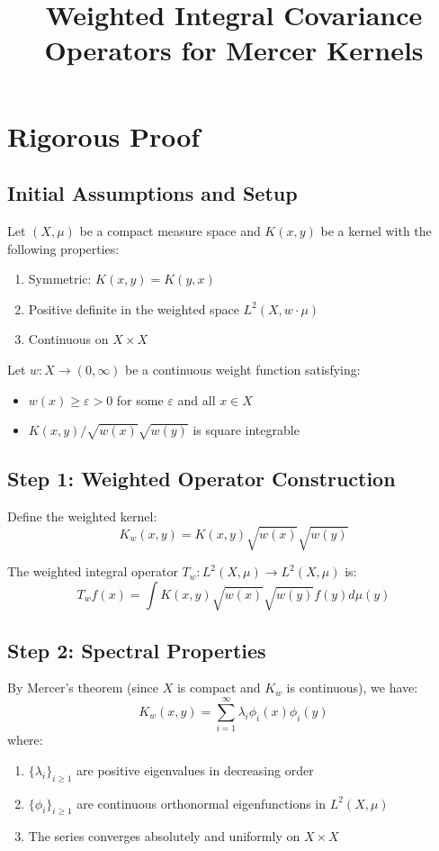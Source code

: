 \documentclass{article}
\title{Weighted Integral Covariance Operators for Mercer Kernels}
\author{}
\date{}
\begin{document}
\maketitle

\section{Rigorous Proof}

\subsection{Initial Assumptions and Setup}

Let $(X, \mu)$ be a compact measure space and $K(x,y)$ be a kernel with the following properties:
\begin{enumerate}
    \item Symmetric: $K(x,y) = K(y,x)$
    \item Positive definite in the weighted space $L^2(X,w\cdot\mu)$
    \item Continuous on $X \times X$
\end{enumerate}

Let $w: X \to (0,\infty)$ be a continuous weight function satisfying:
\begin{itemize}
    \item $w(x) \geq \varepsilon > 0$ for some $\varepsilon$ and all $x \in X$
    \item $K(x,y)/\sqrt{w(x)}\sqrt{w(y)}$ is square integrable
\end{itemize}

\subsection{Step 1: Weighted Operator Construction}

Define the weighted kernel:
\[
K_w(x,y) = K(x,y)\sqrt{w(x)}\sqrt{w(y)}
\]

The weighted integral operator $T_w: L^2(X,\mu) \to L^2(X,\mu)$ is:
\[
T_w f(x) = \int K(x,y)\sqrt{w(x)}\sqrt{w(y)}f(y)d\mu(y)
\]

\subsection{Step 2: Spectral Properties}

By Mercer's theorem (since $X$ is compact and $K_w$ is continuous), we have:
\[
K_w(x,y) = \sum_{i=1}^{\infty} \lambda_i \phi_i(x)\phi_i(y)
\]
where:
\begin{enumerate}
    \item $\{\lambda_i\}_{i\geq1}$ are positive eigenvalues in decreasing order
    \item $\{\phi_i\}_{i\geq1}$ are continuous orthonormal eigenfunctions in $L^2(X,\mu)$
    \item The series converges absolutely and uniformly on $X \times X$
\end{enumerate}
\end{document}
